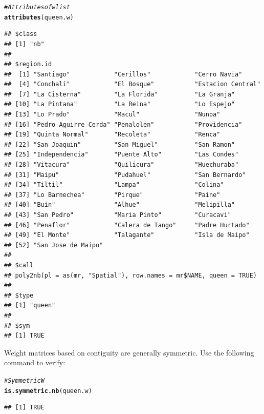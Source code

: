 \documentclass[english,12pt]{book}\usepackage[]{graphicx}\usepackage[]{xcolor}
\makeatletter
\newcommand{\hlcom}[1]{\textcolor[rgb]{0.678,0.584,0.686}{\textit{#1}}}%
\newcommand{\hlstd}[1]{\textcolor[rgb]{0.345,0.345,0.345}{#1}}%
\newcommand{\hlkwd}[1]{\textcolor[rgb]{0.737,0.353,0.396}{\textbf{#1}}}%
\newenvironment{kframe}{%
 \def\at@end@of@kframe{}%
 \ifinner\ifhmode%
  \def\at@end@of@kframe{\end{minipage}}%
  \begin{minipage}{\columnwidth}%
 \fi\fi%
 \def\FrameCommand##1{\hskip\@totalleftmargin \hskip-\fboxsep
 \colorbox{shadecolor}{##1}\hskip-\fboxsep
     \hskip-\linewidth \hskip-\@totalleftmargin \hskip\columnwidth}%
 \MakeFramed {\advance\hsize-\width
   \@totalleftmargin\z@ \linewidth\hsize
   \@setminipage}}%
 {\par\unskip\endMakeFramed%
 \at@end@of@kframe}
\newenvironment{knitrout}{}{} %
\makeatother
\begin{document}
\begin{knitrout}
\color{fgcolor}\begin{kframe}
\begin{alltt}
\hlcom{# Attributes of wlist}
\hlkwd{attributes}\hlstd{(queen.w)}
\end{alltt}
\begin{verbatim}
## $class
## [1] "nb"
## 
## $region.id
##  [1] "Santiago"            "Cerillos"            "Cerro Navia"        
##  [4] "Conchali"            "El Bosque"           "Estacion Central"   
##  [7] "La Cisterna"         "La Florida"          "La Granja"          
## [10] "La Pintana"          "La Reina"            "Lo Espejo"          
## [13] "Lo Prado"            "Macul"               "Nunoa"              
## [16] "Pedro Aguirre Cerda" "Penalolen"           "Providencia"        
## [19] "Quinta Normal"       "Recoleta"            "Renca"              
## [22] "San Joaquin"         "San Miguel"          "San Ramon"          
## [25] "Independencia"       "Puente Alto"         "Las Condes"         
## [28] "Vitacura"            "Quilicura"           "Huechuraba"         
## [31] "Maipu"               "Pudahuel"            "San Bernardo"       
## [34] "Tiltil"              "Lampa"               "Colina"             
## [37] "Lo Barnechea"        "Pirque"              "Paine"              
## [40] "Buin"                "Alhue"               "Melipilla"          
## [43] "San Pedro"           "Maria Pinto"         "Curacavi"           
## [46] "Penaflor"            "Calera de Tango"     "Padre Hurtado"      
## [49] "El Monte"            "Talagante"           "Isla de Maipo"      
## [52] "San Jose de Maipo"  
## 
## $call
## poly2nb(pl = as(mr, "Spatial"), row.names = mr$NAME, queen = TRUE)
## 
## $type
## [1] "queen"
## 
## $sym
## [1] TRUE
\end{verbatim}
\end{kframe}
\end{knitrout}

Weight matrices based on contiguity are generally symmetric. Use the following command to verify:
\begin{knitrout}
\color{fgcolor}\begin{kframe}
\begin{alltt}
\hlcom{# Symmetric W}
\hlkwd{is.symmetric.nb}\hlstd{(queen.w)}
\end{alltt}
\begin{verbatim}
## [1] TRUE
\end{verbatim}
\end{kframe}
\end{knitrout}
\end{document}
